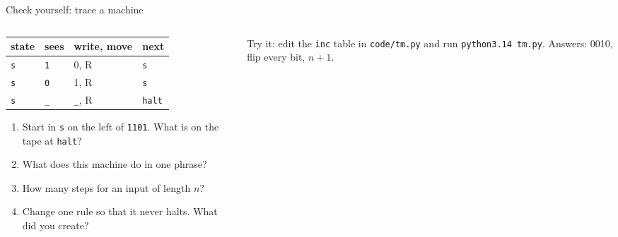 \begin{frame}{Check yourself: trace a machine}
\begin{columns}[T]
\begin{column}{0.5\textwidth}
\begin{tabular}{@{}llll@{}}
\toprule
\textbf{state} & \textbf{sees} & \textbf{write, move} & \textbf{next}\\\midrule
\texttt{s} & \texttt{1} & 0, R & \texttt{s}\\
\texttt{s} & \texttt{0} & 1, R & \texttt{s}\\
\texttt{s} & \texttt{\_} & \texttt{\_}, R & \texttt{halt}\\\bottomrule
\end{tabular}
\vspace{3mm}

\begin{enumerate}\setlength\itemsep{1mm}\small
\item Start in \texttt{s} on the left of \texttt{1101}. What is on the tape at \texttt{halt}?
\item What does this machine do in one phrase?
\item How many steps for an input of length $n$?
\item Change one rule so that it never halts. What did you create?
\end{enumerate}
\end{column}
\begin{column}{0.46\textwidth}
\vspace{2mm}

{\footnotesize Try it: edit the \texttt{inc} table in \texttt{code/tm.py} and run \texttt{python3.14 tm.py}. Answers: 0010, flip every bit, $n+1$.}
\end{column}
\end{columns}
\end{frame}
